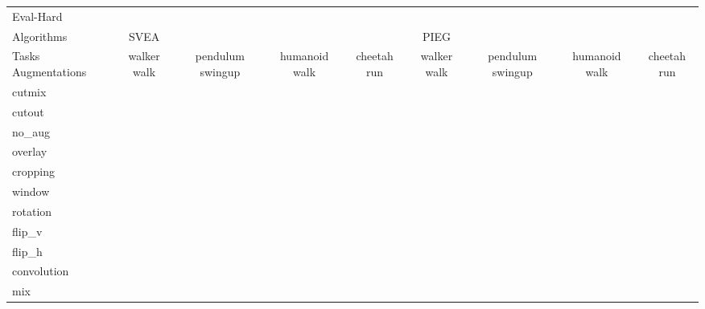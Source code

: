 \begin{tabular}{lcccccccc}
Eval-Hard & & & & & & & & \\
Algorithms & SVEA & & & & PIEG & & & \\
Tasks Augmentations & walker walk & pendulum swingup & humanoid walk & cheetah run & walker walk & pendulum swingup & humanoid walk & cheetah run \\
cutmix          &  &  &  &  &  &  &  &  \\
cutout          &  &  &  &  &  &  &  &  \\
no\_aug         &  &  &  &  &  &  &  &  \\
overlay         &  &  &  &  &  &  &  &  \\
cropping        &  &  &  &  &  &  &  &  \\
window          &  &  &  &  &  &  &  &  \\
rotation        &  &  &  &  &  &  &  &  \\
flip\_v         &  &  &  &  &  &  &  &  \\
flip\_h         &  &  &  &  &  &  &  &  \\
convolution     &  &  &  &  &  &  &  &  \\
mix             &  &  &  &  &  &  &  &  \\
\end{tabular}